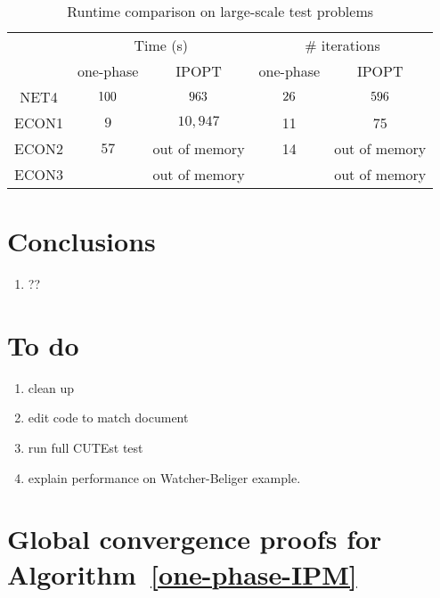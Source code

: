 \documentclass{article}
\begin{document}
\begin{table}[H]
\begin{tabular}{|c| c c | c c |}
  \hline
  \multirow{2}{*}{} 
      & \multicolumn{2}{c|}{Time (s)} 
          & \multicolumn{2}{|c|}{\# iterations} \\             \cline{2-5}
  & one-phase & IPOPT & one-phase & IPOPT \\  \hline
  NET4 & $100$ & $963$  & $26$   & $596$ \\      \hline
  ECON1 & $9$  & $10,947$  & 11 & 75  \\      \hline
  ECON2 & $57$  &  out of memory & 14 & out of memory \\      \hline
  ECON3 &  &out of memory & & out of memory \\      \hline
\end{tabular}
\caption{Runtime comparison on large-scale test problems}\label{compare-runtime}
\end{table}


\section{Conclusions}
\begin{enumerate}
\item ??
\end{enumerate}


\section{To do}

\begin{enumerate}
\item clean up 
\item edit code to match document
\item run full CUTEst test
\item explain performance on Watcher-Beliger example.
\end{enumerate}




\appendix

\section{Global convergence proofs for Algorithm~\ref{one-phase-IPM}}\label{app:global-conv}
\end{document}
